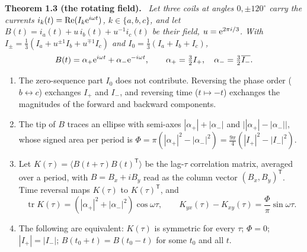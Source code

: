 \documentclass[11pt]{article}
\theoremstyle{definition}\newtheorem{definition}[theorem]{Definition}
\theoremstyle{remark}\newtheorem{remark}[theorem]{Remark}
\newenvironment{mainresult}[1]{\par\medskip\noindent\textbf{#1}\ \itshape\ignorespaces}{\par\medskip}
\renewcommand{\Re}{\operatorname{Re}}\renewcommand{\Im}{\operatorname{Im}}
\begin{document}
\begin{mainresult}{Theorem 1.3 (the rotating field).}
Let three coils at angles $0,\pm120^\circ$ carry the currents $i_k(t)=\Re(I_k\e^{i\omega t})$, $k\in\{a,b,c\}$, and let $B(t)=i_a(t)+u\,i_b(t)+u^{-1}i_c(t)$ be their field, $u=\mathrm e^{2\pi i/3}$. With $I_\pm=\frac13(I_a+u^{\pm1}I_b+u^{\mp1}I_c)$ and $I_0=\frac13(I_a+I_b+I_c)$,
\[
B(t)=\alpha_+\mathrm e^{i\omega t}+\alpha_-\mathrm e^{-i\omega t},\qquad \alpha_+=\tfrac32I_+,\quad \alpha_-=\tfrac32\overline{I_-}.
\]
\begin{enumerate}
\item The zero-sequence part $I_0$ does not contribute. Reversing the phase order ($b\leftrightarrow c$) exchanges $I_+$ and $I_-$, and reversing time ($t\mapsto-t$) exchanges the magnitudes of the forward and backward components.
\item The tip of $B$ traces an ellipse with semi-axes $|\alpha_+|+|\alpha_-|$ and $\bigl||\alpha_+|-|\alpha_-|\bigr|$, whose signed area per period is $\Phi=\pi(|\alpha_+|^2-|\alpha_-|^2)=\frac{9\pi}4(|I_+|^2-|I_-|^2)$.
\item Let $K(\tau)=\langle B(t+\tau)B(t)^{\mathsf T}\rangle$ be the lag-$\tau$ correlation matrix, averaged over a period, with $B=B_x+iB_y$ read as the column vector $(B_x,B_y)^{\mathsf T}$. Time reversal maps $K(\tau)$ to $K(\tau)^{\mathsf T}$, and
\[
\operatorname{tr}K(\tau)=(|\alpha_+|^2+|\alpha_-|^2)\cos\omega\tau,\qquad K_{yx}(\tau)-K_{xy}(\tau)=\frac\Phi\pi\sin\omega\tau .
\]
\item The following are equivalent: $K(\tau)$ is symmetric for every $\tau$; $\Phi=0$; $|I_+|=|I_-|$; $B(t_0+t)=B(t_0-t)$ for some $t_0$ and all $t$.
\end{enumerate}
\end{mainresult}
\end{document}
